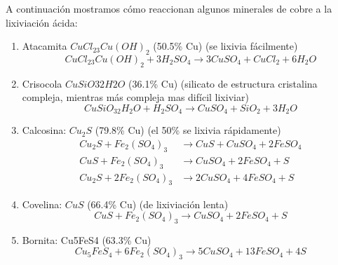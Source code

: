 A continuaci\'on mostramos c\'omo reaccionan algunos minerales de cobre a la lixiviaci\'on \'acida:

\begin{enumerate}
 \item Atacamita  $CuCl_23Cu(OH)_2$   (50.5\% Cu) (se lixivia f\'acilmente)
  \begin{equation}
   CuCl_23Cu(OH)_2 + 3H_2SO_4 \longrightarrow  3CuSO_4 + CuCl_2 + 6H_2O 
  \end{equation}
 \item Crisocola $CuSiO32H2O$      (36.1\% Cu) (silicato de estructura cristalina compleja, mientras m\'as compleja mas dif\'icil lixiviar)
 \begin{equation}
  CuSiO_32H_2O + H_2SO_4 \longrightarrow        CuSO_4 + SiO_2 + 3H_2O
 \end{equation}
 \item Calcosina: $Cu_2S$          (79.8\% Cu) (el 50\% se lixivia r\'apidamente)
 \begin{equation}
  \begin{align}
   Cu_2S + Fe_2(SO_4)_3 & \longrightarrow                     CuS + CuSO_4 + 2FeSO_4 \\ 
CuS + Fe_2(SO_4)_3  & \longrightarrow                     CuSO_4 + 2FeSO_4 +S \\
Cu_2S + 2Fe_2(SO_4)_3   &  \longrightarrow                 2CuSO_4 + 4FeSO_4 + S
  \end{align}
 \end{equation}
 \item Covelina: $CuS$            (66.4\% Cu) (de lixiviaci\'on lenta)
 \begin{equation}
  CuS + Fe_2(SO_4)_3  \longrightarrow        CuSO_4 + 2FeSO_4 + S 
 \end{equation}
 \item Bornita: Cu5FeS4      (63.3\% Cu)
 \begin{equation}
  Cu_5FeS_4 + 6Fe_2(SO_4)_3   \longrightarrow             5CuSO_4 + 13FeSO_4 + 4S 
 \end{equation}

\end{enumerate}
  
